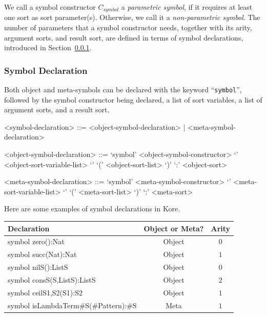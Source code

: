 \documentclass[UTF8,11pt]{article}
\theoremstyle{plain}
\theoremstyle{definition}
\theoremstyle{remark}
\newcommand{\parametric}[2]{{#1}\raisebox{.2ex}{\texttt{\footnotesize{\{}}}#2\raisebox{.2ex}{\texttt{\footnotesize{\}}}}}
\newcommand{\itsymbol}{\mathit{symbol}}
\begin{document}
We call a symbol constructor $C_\itsymbol$ a \emph{parametric symbol}, if it 
requires at least one sort as sort parameter(s).
Otherwise, we call it a \emph{non-parametric symbol}.
The number of parameters that a symbol constructor needs, together with its 
arity, argument sorts, and result sort, are defined in terms of symbol 
declarations, introduced in Section~\ref{sec:kore-syntax-symbol-declaration}.

\subsubsection{Symbol Declaration}
\label{sec:kore-syntax-symbol-declaration}

Both object and meta-symbols can be declared with the keyword 
``\texttt{symbol}'', followed by the symbol constructor being declared, a list 
of sort variables, a list of argument sorts, and a result sort.

\begin{grammar}\small
	<symbol-declaration> ::= <object-symbol-declaration> | 
	<meta-symbol-declaration>
	
	<object-symbol-declaration> ::= \quad
	\alt `symbol' <object-symbol-constructor> `{' 
		<object-sort-variable-list> `}' `(' <object-sort-list> `)' `:' 
		<object-sort>
		
	<meta-symbol-declaration> ::= \quad
	\alt `symbol' <meta-symbol-constructor> `{' 
		<meta-sort-variable-list> `}' `(' <meta-sort-list> `)' `:' 
	<meta-sort>
\end{grammar}

Here are some examples of symbol declarations in Kore.

\begin{center}{\ttfamily
		\begin{tabular}{lcc}
			\textrm{Declaration} & \textrm{Object or Meta?} & \textrm{Arity}
			\\\hline
			symbol \parametric{zero}{}():\parametric{Nat}{} & \textrm{Object} & 
			$0$
			\\\hline
			symbol \parametric{succ}{}(\parametric{Nat}{}):\parametric{Nat}{} & 
			\textrm{Object} & $1$
			\\\hline
			symbol \parametric{nil}{S}():\parametric{List}{S} & \textrm{Object} 
			& $0$
			\\\hline
			symbol 
			\parametric{cons}{S}(S,\parametric{List}{S}):\parametric{List}{S} & 
			\textrm{Object} & $2$
			\\\hline
			symbol \parametric{ceil}{S1,S2}(S1):S2 & \textrm{Object} & $1$
			\\\hline
			symbol \parametric{isLambdaTerm}{\#S}(\parametric{\#Pattern}{}):\#S 
			& 
			\textrm{Meta} & $1$
		\end{tabular}
	}
\end{center}
\end{document}
